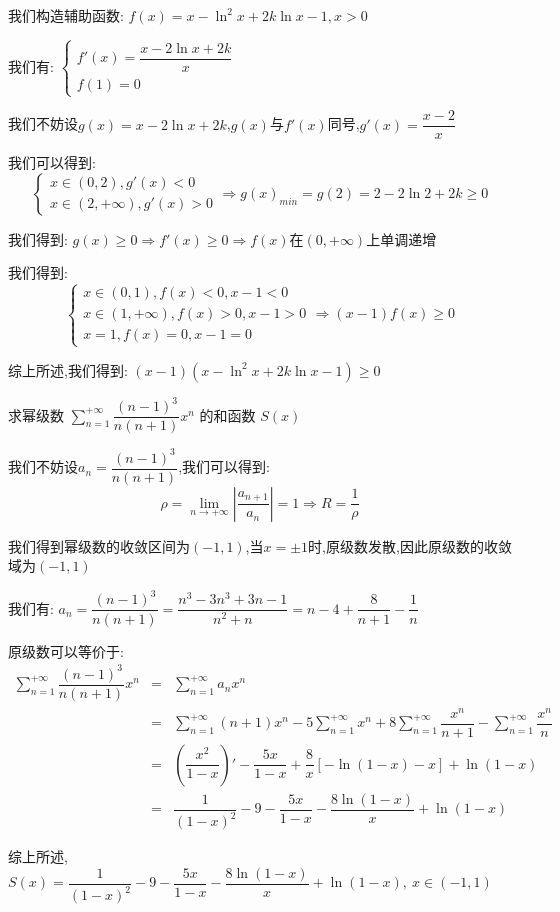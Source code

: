 \begin{solution}

	我们构造辅助函数:  $f(x)=x-\ln^2 x+2k\ln x-1,x>0$
	
	我们有:  $\left\lbrace
	\begin{array}{l}
		f'(x)=\dfrac{x-2\ln x+2k}{x}\\
		f(1)=0
	\end{array}
	\right. $
	
	我们不妨设$g(x)=x-2\ln x+2k$,$g(x)$与$f'(x)$同号,$g'(x)=\dfrac{x-2}{x}$
	
	我们可以得到:  $$\left\lbrace
	\begin{array}{l}
		x\in(0,2),g'(x)<0\\
		x\in(2,+\infty),g'(x)>0
	\end{array}
	\right. \Rightarrow g(x)_{min}=g(2)=2-2\ln2+2k\geq 0$$
	
	我们得到:  $g(x)\geq 0\Rightarrow f'(x)\geq 0\Rightarrow f(x)\text{在}(0,+\infty)\text{上单调递增}$
	
	我们得到:  
	$$\left\lbrace
	\begin{array}{l}
		x\in(0,1),f(x)<0,x-1<0\\
		x\in(1,+\infty),f(x)>0,x-1>0\\
		x=1,f(x)=0,x-1=0
	\end{array}
	\right. \Rightarrow (x-1)f(x)\geq 0$$
	
	综上所述,我们得到:  $(x-1)(x-\ln^2 x+2k\ln x-1)\geq 0$
\end{solution}

\begin{example}[][Exam: 35.3.12]
	求幂级数 $\sum\limits_{n=1}^{+\infty}\dfrac{(n-1)^3}{n(n+1)}x^n$ 的和函数 $S(x)$
\end{example}

\begin{solution}

	我们不妨设$a_{n}=\dfrac{(n-1)^3}{n(n+1)}$,我们可以得到:  
	$$\rho=\lim\limits_{n\to+\infty}|\dfrac{a_{n+1}}{a_{n}}|=1\Rightarrow R=\dfrac{1}{\rho}$$
	
	我们得到幂级数的收敛区间为$(-1,1)$,当$x=\pm 1$时,原级数发散,因此原级数的收敛域为$(-1,1)$
	
	我们有:  $a_{n}=\dfrac{(n-1)^3}{n(n+1)}=\dfrac{n^3-3n^3+3n-1}{n^2+n}=n-4+\dfrac{8}{n+1}-\dfrac{1}{n}$
	
	原级数可以等价于:  
	\begin{eqnarray*}
		\sum\limits_{n=1}^{+\infty}\dfrac{(n-1)^3}{n(n+1)}x^n&=&\sum\limits_{n=1}^{+\infty}a_{n}x^n\\
		&=&\sum\limits_{n=1}^{+\infty}(n+1)x^n-5\sum\limits_{n=1}^{+\infty}x^n+8\sum\limits_{n=1}^{+\infty}\dfrac{x^n}{n+1}-\sum\limits_{n=1}^{+\infty}\dfrac{x^n}{n}\\
		&=&(\dfrac{x^2}{1-x})'-\dfrac{5x}{1-x}+\dfrac{8}{x}[-\ln(1-x)-x]+\ln(1-x)\\
		&=&\dfrac{1}{(1-x)^2}-9-\dfrac{5x}{1-x}-\dfrac{8\ln(1-x)}{x}+\ln(1-x)
	\end{eqnarray*}

综上所述,$S(x)=\dfrac{1}{(1-x)^2}-9-\dfrac{5x}{1-x}-\dfrac{8\ln(1-x)}{x}+\ln(1-x), \ x\in(-1,1)$
\end{solution}


